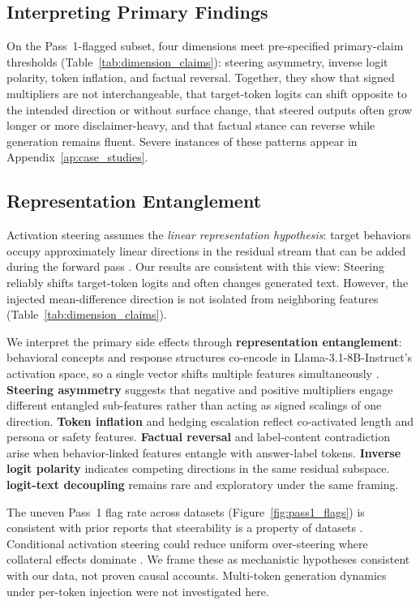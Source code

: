 \subsection{Interpreting Primary Findings}
On the Pass~1-flagged subset, four dimensions meet pre-specified primary-claim thresholds (Table~\ref{tab:dimension_claims}): steering asymmetry, inverse logit polarity, token inflation, and factual reversal.
Together, they show that signed multipliers are not interchangeable, that target-token logits can shift opposite to the intended direction or without surface change, that steered outputs often grow longer or more disclaimer-heavy, and that factual stance can reverse while generation remains fluent.
Severe instances of these patterns appear in Appendix~\ref{ap:case_studies}.

\subsection{Representation Entanglement}\label{Entanglement}
Activation steering assumes the \textit{linear representation hypothesis}: target behaviors occupy approximately linear directions in the residual stream that can be added during the forward pass \citep{parkLinearRepresentationHypothesis2024, turnerSteeringLanguageModels2023}.
Our results are consistent with this view: Steering reliably shifts target-token logits and often changes generated text. However, the injected mean-difference direction is not isolated from neighboring features (Table~\ref{tab:dimension_claims}).

We interpret the primary side effects through \textbf{representation entanglement}: behavioral concepts and response structures co-encode in Llama-3.1-8B-Instruct's activation space, so a single vector shifts multiple features simultaneously \citep{zouRepresentationEngineeringTopDown2025, elhageToyModelsSuperposition2022}.
\textbf{Steering asymmetry} suggests that negative and positive multipliers engage different entangled sub-features rather than acting as signed scalings of one direction.
\textbf{Token inflation} and hedging escalation reflect co-activated length and persona or safety features.
\textbf{Factual reversal} and label-content contradiction arise when behavior-linked features entangle with answer-label tokens.
\textbf{Inverse logit polarity} indicates competing directions in the same residual subspace. \textbf{logit-text decoupling} remains rare and exploratory under the same framing.

The uneven Pass~1 flag rate across datasets (Figure~\ref{fig:pass1_flags}) is consistent with prior reports that steerability is a property of datasets \citep{tanAnalysingGeneralisationReliability2024}.
Conditional activation steering could reduce uniform over-steering where collateral effects dominate \citep{leeProgrammingRefusalConditional2025}.
We frame these as mechanistic hypotheses consistent with our data, not proven causal accounts. Multi-token generation dynamics under per-token injection were not investigated here.

